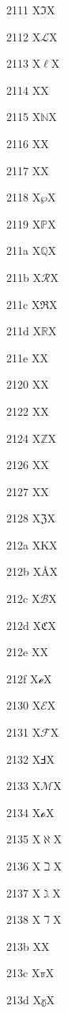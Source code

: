 \documentclass[11pt]{article}
\begin{document}
2111 X{\ensuremath{\Im}}X

2112 X{\ensuremath{\mathscr{L}}}X

2113 X{\ensuremath{\ell}}X

2114 X{\Pfund}X

2115 X{\ensuremath{\mathbb{N}}}X

2116 X{\textnumero}X

2117 X{\textcircledP}X

2118 X{\ensuremath{\wp}}X

2119 X{\ensuremath{\mathbb{P}}}X

211a X{\ensuremath{\mathbb{Q}}}X

211b X{\ensuremath{\mathscr{R}}}X

211c X{\ensuremath{\Re}}X

211d X{\ensuremath{\mathbb{R}}}X

211e X{\textrecipe}X

2120 X{\textservicemark}X

2122 X{\texttrademark}X

2124 X{\ensuremath{\mathbb{Z}}}X

2126 X{\textohm}X

2127 X{\textmho}X

2128 X{\ensuremath{\mathfrak{Z}}}X

212a X{K}X

212b X{\AA}X

212c X{\ensuremath{\mathscr{B}}}X

212d X{\ensuremath{\mathfrak{C}}}X

212e X{\textestimated}X

212f X{\ensuremath{\mathscr{e}}}X

2130 X{\ensuremath{\mathscr{E}}}X

2131 X{\ensuremath{\mathscr{F}}}X

2132 X{\ensuremath{\Finv}}X

2133 X{\ensuremath{\mathscr{M}}}X

2134 X{\ensuremath{\mathscr{o}}}X

2135 X{\ensuremath{\aleph}}X

2136 X{\ensuremath{\beth}}X

2137 X{\ensuremath{\gimel}}X

2138 X{\ensuremath{\daleth}}X

213b X{\fax}X

213c X{\ensuremath{\mathbb{\pi}}}X

213d X{\ensuremath{\mathbb{\gamma}}}X
\end{document}
